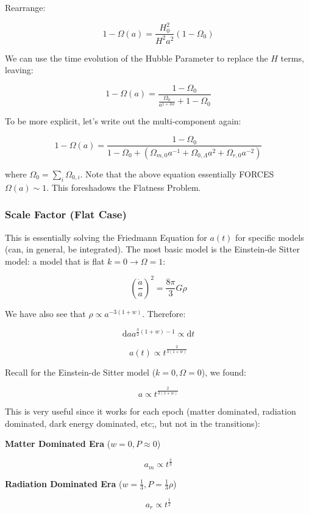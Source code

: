 \documentclass{article}
\newcommand{\be}{\begin{equation}}
\newcommand{\ee}{\end{equation}}
\begin{document}
Rearrange:

\be
1 - \Omega(a) = \frac{H_0^2}{H^2a^2}\left(1-\Omega_0\right)
\ee

We can use the time evolution of the Hubble Parameter to replace the $H$ terms, leaving:

\be
\boxed{1-\Omega(a) = \frac{1-\Omega_0}{\frac{\Omega_0}{a^{1+3w}} + 1-\Omega_0   }}
\ee

To be more explicit, let's write out the multi-component again:

\be
1 - \Omega(a) = \frac{1 - \Omega_0}{1 - \Omega_0 + \left(\Omega_{m,0}a^{-1} + \Omega_{0,\Lambda}a^{2} + \Omega_{r,0}a^{-2}\right)}
\ee

where $\Omega_0 = \sum_i \Omega_{0,i}$. Note that the above equation essentially FORCES $\Omega(a) \sim 1$. This foreshadows the Flatness Problem.

\subsubsection{Scale Factor (Flat Case)}

This is essentially solving the Friedmann Equation for $a(t)$ for specific models (can, in general, be integrated). The most basic model is the Einstein-de Sitter model: a model that is flat $k = 0 \rightarrow \Omega =1$:

\be
\left(\frac{\dot a}{a}\right)^2 = \frac{8\pi}{3}G\rho
\ee

We have also see that $\rho \propto a^{-3(1+w)}$. Therefore:

\be
\mathrm{d} a a^{\frac32 (1+w)-1} \propto \mathrm{d}t
\ee

\be
\boxed{a(t) \propto t^{\frac{2}{3(1+w)}}}
\ee

Recall for the Einstein-de Sitter model ($k=0, \Omega=0$), we found:

\be
a \propto t^{\frac{2}{3(1+w)}}
\ee

This is very useful since it works for each epoch (matter dominated, radiation dominated, dark energy dominated, etc;, but not in the transitions):

\textbf{Matter Dominated Era} ($w=0, P\approx0$)

\begin{equation}
    \boxed{a_{m}\propto t^{\frac23}}
\end{equation}

\textbf{Radiation Dominated Era} ($w=\frac13, P=\frac13 \rho$)

\begin{equation}
    \boxed{a_{r}\propto t^{\frac12}}
\end{equation}
\end{document}
